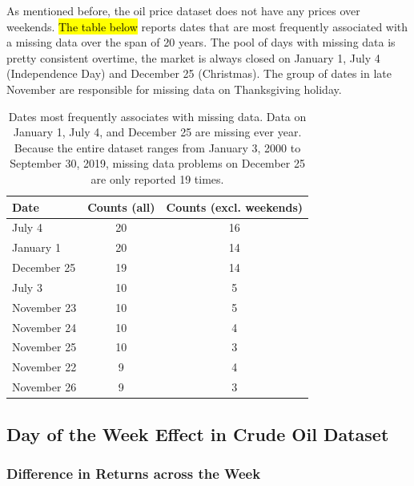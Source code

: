 \documentclass[12pt]{article}
\begin{document}
	\par As mentioned before, the oil price dataset does not have any prices over weekends. \hl{The table below} reports dates that are most frequently associated with a missing data over the span of 20 years. The pool of days with missing data is pretty consistent overtime, the market is always closed on January 1, July 4 (Independence Day) and December 25 (Christmas). The group of dates in late November are responsible for missing data on Thanksgiving holiday.
	\begin{table}[H]
		\small
		\centering
		\begin{tabular}{l|c c}
			\toprule
			Date & Counts (all) & Counts (excl. weekends) \\
			\midrule
			July 4 & 20 & 16 \\
			January 1 & 20 & 14 \\
			December 25 & 19 & 14 \\
			July 3 & 10 & 5 \\
			November 23 & 10 & 5 \\
			November 24 & 10 & 4\\
			November 25 & 10 & 3\\
			November 22 & 9 & 4 \\
			November 26 & 9 & 3 \\
			\bottomrule
		\end{tabular}
		\caption{Dates most frequently associates with missing data. Data on January 1, July 4, and December 25 are missing ever year. Because the entire dataset ranges from January 3, 2000 to September 30, 2019, missing data problems on December 25 are only reported 19 times.}
	\end{table}
 
	\subsection{Day of the Week Effect in Crude Oil Dataset}
	\subsubsection{Difference in Returns across the Week}
\end{document}
